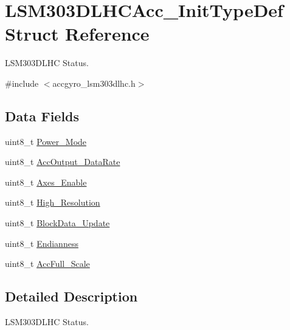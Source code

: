 \hypertarget{structLSM303DLHCAcc__InitTypeDef}{\section{L\+S\+M303\+D\+L\+H\+C\+Acc\+\_\+\+Init\+Type\+Def Struct Reference}
\label{structLSM303DLHCAcc__InitTypeDef}
}


L\+S\+M303\+D\+L\+H\+C Status.  




{\ttfamily \#include $<$accgyro\+\_\+lsm303dlhc.\+h$>$}

\subsection*{Data Fields}
\begin{DoxyCompactItemize}
\item 
uint8\+\_\+t \hyperlink{structLSM303DLHCAcc__InitTypeDef_aa57e93d62ad4bd61d8da81b3fec26a13}{Power\+\_\+\+Mode}
\item 
uint8\+\_\+t \hyperlink{structLSM303DLHCAcc__InitTypeDef_a4068b4c768d1e63eb26fe32ca50a9a34}{Acc\+Output\+\_\+\+Data\+Rate}
\item 
uint8\+\_\+t \hyperlink{structLSM303DLHCAcc__InitTypeDef_a41bd683db7b4b32b0cac4ceae21350c4}{Axes\+\_\+\+Enable}
\item 
uint8\+\_\+t \hyperlink{structLSM303DLHCAcc__InitTypeDef_a2a5a56ec13b3326b0b9c3fd91bd39c8a}{High\+\_\+\+Resolution}
\item 
uint8\+\_\+t \hyperlink{structLSM303DLHCAcc__InitTypeDef_a80f3e1243dc8e7e42e465edc94a223c8}{Block\+Data\+\_\+\+Update}
\item 
uint8\+\_\+t \hyperlink{structLSM303DLHCAcc__InitTypeDef_a740084aed9645552c055544cc7a24eb9}{Endianness}
\item 
uint8\+\_\+t \hyperlink{structLSM303DLHCAcc__InitTypeDef_a1c8b521caab8b30b7bbdf4bd21e6d512}{Acc\+Full\+\_\+\+Scale}
\end{DoxyCompactItemize}


\subsection{Detailed Description}
L\+S\+M303\+D\+L\+H\+C Status. 

